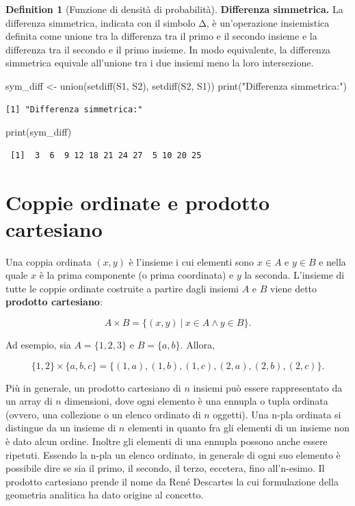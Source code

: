 \documentclass[
  letterpaper,
  DIV=11,
  numbers=noendperiod,
  oneside]{scrreprt}
\newenvironment{Shaded}{\begin{snugshade}}{\end{snugshade}}
\newcommand{\FunctionTok}[1]{\textcolor[rgb]{0.28,0.35,0.67}{#1}}
\newcommand{\NormalTok}[1]{\textcolor[rgb]{0.00,0.23,0.31}{#1}}
\newcommand{\OtherTok}[1]{\textcolor[rgb]{0.00,0.23,0.31}{#1}}
\newcommand{\StringTok}[1]{\textcolor[rgb]{0.13,0.47,0.30}{#1}}
\theoremstyle{definition}
\theoremstyle{plain}
\theoremstyle{definition}
\newtheorem{definition}{Definition}[chapter]
\theoremstyle{remark}
\begin{document}
\begin{definition}[Funzione di densità di
probabilità]
\textbf{Differenza simmetrica.} La differenza simmetrica, indicata con
il simbolo Δ, è un'operazione insiemistica definita come unione tra la
differenza tra il primo e il secondo insieme e la differenza tra il
secondo e il primo insieme. In modo equivalente, la differenza
simmetrica equivale all'unione tra i due insiemi meno la loro
intersezione.

\begin{Shaded}
\begin{Highlighting}[]
\NormalTok{sym\_diff }\OtherTok{\textless{}{-}} \FunctionTok{union}\NormalTok{(}\FunctionTok{setdiff}\NormalTok{(S1, S2), }\FunctionTok{setdiff}\NormalTok{(S2, S1))}
\FunctionTok{print}\NormalTok{(}\StringTok{"Differenza simmetrica:"}\NormalTok{)}
\end{Highlighting}
\end{Shaded}

\begin{verbatim}
[1] "Differenza simmetrica:"
\end{verbatim}

\begin{Shaded}
\begin{Highlighting}[]
\FunctionTok{print}\NormalTok{(sym\_diff)}
\end{Highlighting}
\end{Shaded}

\begin{verbatim}
 [1]  3  6  9 12 18 21 24 27  5 10 20 25
\end{verbatim}

\section{Coppie ordinate e prodotto
cartesiano}\label{coppie-ordinate-e-prodotto-cartesiano}

Una coppia ordinata \((x,y)\) è l'insieme i cui elementi sono
\(x \in A\) e \(y \in B\) e nella quale \(x\) è la prima componente (o
prima coordinata) e \(y\) la seconda. L'insieme di tutte le coppie
ordinate costruite a partire dagli insiemi \(A\) e \(B\) viene detto
\textbf{prodotto cartesiano}:

\[
A \times B = \{(x, y) ~\vert~ x \in A \land y \in B\}.
\]

Ad esempio, sia \(A = \{1, 2, 3\}\) e \(B = \{a, b\}\). Allora,

\[
\{1, 2\} \times \{a, b, c\} = \{(1, a), (1, b), (1, c), (2, a), (2, b), (2, c)\}.
\]

Più in generale, un prodotto cartesiano di \(n\) insiemi può essere
rappresentato da un array di \(n\) dimensioni, dove ogni elemento è una
ennupla o tupla ordinata (ovvero, una collezione o un elenco ordinato di
\(n\) oggetti). Una n-pla ordinata si distingue da un insieme di \(n\)
elementi in quanto fra gli elementi di un insieme non è dato alcun
ordine. Inoltre gli elementi di una ennupla possono anche essere
ripetuti. Essendo la n-pla un elenco ordinato, in generale di ogni suo
elemento è possibile dire se sia il primo, il secondo, il terzo,
eccetera, fino all'n-esimo. Il prodotto cartesiano prende il nome da
René Descartes la cui formulazione della geometria analitica ha dato
origine al concetto.


\end{definition}
\end{document}
